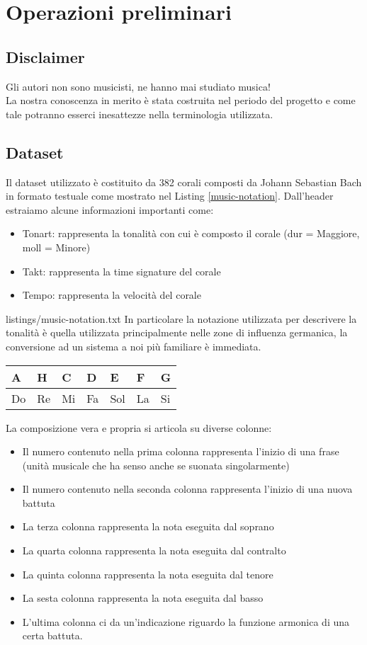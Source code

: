 \chapter{Operazioni preliminari}\label{ch:th-music}

\section{Disclaimer}
Gli autori non sono musicisti, ne hanno mai studiato musica! \\
La nostra conoscenza in merito è stata costruita nel periodo del progetto e come tale potranno esserci inesattezze nella terminologia utilizzata.

\section{Dataset}
Il dataset utilizzato è costituito da 382 corali composti da Johann Sebastian Bach in formato testuale come mostrato nel Listing \ref{music-notation}.
Dall'header estraiamo alcune informazioni importanti come:
\begin{itemize}
\item Tonart: rappresenta la tonalità con cui è composto il corale (dur = Maggiore, moll = Minore)
\item Takt: rappresenta la time signature del corale
\item Tempo: rappresenta la velocità del corale
\end{itemize}

	{listings/music-notation.txt}
\noindent
In particolare la notazione utilizzata per descrivere la tonalità è quella utilizzata principalmente nelle zone di influenza germanica, la conversione ad un sistema a noi più familiare è immediata.
\begin{table}[H]
\centering
\begin{tabular}{|l|l|l|l|l|l|l|}
\hline
A  & H  & C  & D  & E   & F  & G  \\ \hline
Do & Re & Mi & Fa & Sol & La & Si \\ \hline
\end{tabular}
\end{table}
\noindent
La composizione vera e propria si articola su diverse colonne:
\begin{itemize}
\item Il numero contenuto nella prima colonna rappresenta l'inizio di una frase (unità musicale che ha senso anche se suonata singolarmente)
\item Il numero contenuto nella seconda colonna rappresenta l'inizio di una nuova battuta
\item La terza colonna rappresenta la nota eseguita dal soprano
\item La quarta colonna rappresenta la nota eseguita dal contralto
\item La quinta colonna rappresenta la nota eseguita dal tenore
\item La sesta colonna rappresenta la nota eseguita dal basso
\item L'ultima colonna ci da un'indicazione riguardo la funzione armonica di una certa battuta.
\end{itemize}
